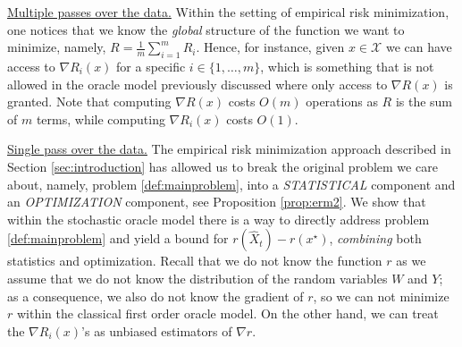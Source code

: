 \underline{Multiple passes over the data.}
Within the setting of empirical risk minimization, one notices that we know the \emph{global} structure of the function we want to minimize, namely, $R=\frac{1}{m}\sum_{i=1}^m R_i$. Hence, for instance, given $x\in\mathcal{X}$ we can have access to $\nabla R_i(x)$ for a specific $i\in\{1,\ldots,m\}$, which is something that is not allowed in the oracle model previously discussed where only access to $\nabla R(x)$ is granted. Note that computing $\nabla R(x)$ costs $O(m)$ operations as $R$ is the sum of $m$ terms, while computing $\nabla R_i(x)$ costs $O(1)$.

\underline{Single pass over the data.}
The empirical risk minimization approach described in Section \ref{sec:introduction} has allowed us to break the original problem we care about, namely, problem \eqref{def:mainproblem}, into a \emph{STATISTICAL} component and an \emph{OPTIMIZATION} component, see Proposition \ref{prop:erm2}. We show that within the stochastic oracle model there is a way to directly address problem \eqref{def:mainproblem} and yield a bound for $r(\hat X_t) - r(x^\star)$, \emph{combining} both statistics and optimization.
Recall that we do not know the function $r$ as we assume that we do not know the distribution of the random variables $W$ and $Y$; as a consequence, we also do not know the gradient of $r$, so we can not minimize $r$ within the classical first order oracle model. On the other hand, we can treat the $\nabla R_i(x)$'s as unbiased estimators of $\nabla r$.

\clearpage


